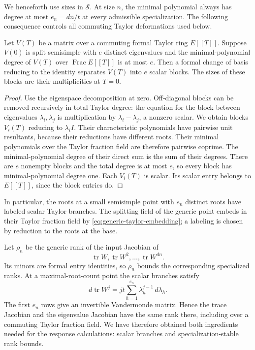 We henceforth use sizes in $\mathcal S$.  At size $n$, the minimal
polynomial always has degree at most $e_n=dn/t$ at every admissible
specialization.  The following consequence controls all commuting
Taylor deformations used below.

\begin{lemma}
\label{lem:scalar-branches}
Let $V(T)$ be a matrix over a commuting formal Taylor ring $E[[T]]$.
Suppose $V(0)$ is split semisimple with $e$ distinct eigenvalues and
the minimal-polynomial degree of $V(T)$ over
$\operatorname{Frac}E[[T]]$ is at most $e$.  Then a formal change of
basis reducing to the identity separates $V(T)$ into $e$ scalar
blocks.  The sizes of these blocks are their multiplicities at
$T=0$.
\end{lemma}

\begin{proof}
Use the eigenspace decomposition at zero.  Off-diagonal blocks can be
removed recursively in total Taylor degree: the equation for the
block between eigenvalues $\lambda_i,\lambda_j$ is multiplication
by $\lambda_i-\lambda_j$, a nonzero scalar.  We obtain blocks
$V_i(T)$ reducing to $\lambda_i I$.  Their characteristic polynomials
have pairwise unit resultants, because their reductions have different
roots.  Their minimal polynomials over the Taylor fraction field are
therefore pairwise coprime.  The minimal-polynomial degree of their
direct sum is the sum of their degrees.  There are $e$ nonempty
blocks and the total degree is at most $e$, so every block has
minimal-polynomial degree one.  Each $V_i(T)$ is scalar.  Its scalar
entry belongs to $E[[T]]$, since the block entries do.
\end{proof}

In particular, the roots at a small semisimple point with $e_n$
distinct roots have labeled scalar Taylor branches.  The splitting
field of the generic point embeds in their Taylor fraction field by
\eqref{eq:generic-taylor-embedding}; a labeling is chosen by reduction
to the roots at the base.

Let $\rho_n$ be the generic rank of the input Jacobian of
\[
 \operatorname{tr}W,\operatorname{tr}W^2,\ldots,
 \operatorname{tr}W^{dn}.
\]
Its minors are formal entry identities, so $\rho_n$ bounds the
corresponding specialized ranks.  At a maximal-root-count point the
scalar branches satisfy
\[
 d\operatorname{tr}W^j
   =jt\sum_{h=1}^{e_n}\lambda_h^{j-1}\,d\lambda_h.
\]
The first $e_n$ rows give an invertible Vandermonde matrix.  Hence
the trace Jacobian and the eigenvalue Jacobian have the same rank
there, including over a commuting Taylor fraction field.  We have
therefore obtained both ingredients needed for the response
calculations: scalar branches and specialization-stable rank bounds.
